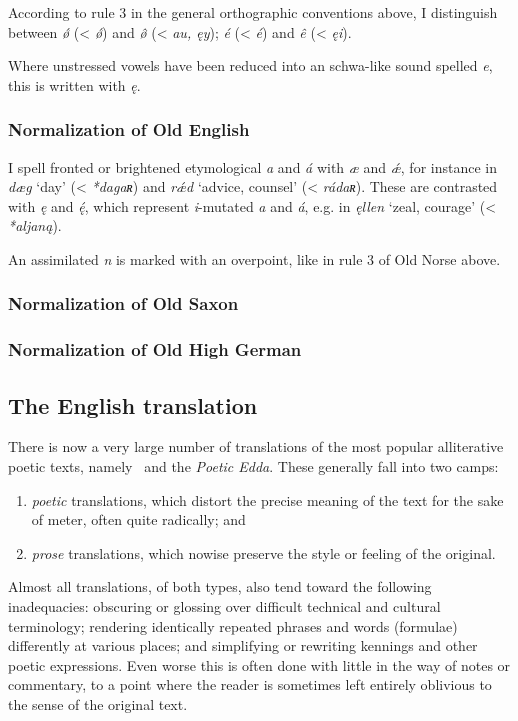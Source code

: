    According to rule 3 in the general orthographic conventions above, I distinguish between \emph{ǿ} (< \emph{ǿ}) and \emph{ø̂} (< \emph{au, ęy}); \emph{é} (< \emph{é}) and \emph{ê} (< \emph{ęi}).

    Where unstressed vowels have been reduced into an schwa-like sound spelled \emph{e}, this is written with \emph{ę}.

    \subsubsection{Normalization of Old English}
    I spell fronted or brightened etymological \emph{a} and \emph{á} with \emph{æ} and \emph{ǽ}, for instance in \emph{dæg} ‘day’ (< \emph{*dagaʀ}) and \emph{rǽd} ‘advice, counsel’ (< \emph{rádaʀ}).  These are contrasted with \emph{ę} and \emph{ę́}, which represent \emph{i}-mutated \emph{a} and \emph{á}, e.g. in \emph{ęllen} ‘zeal, courage’ (< \emph{*aljaną}).

    An assimilated \emph{n} is marked with an overpoint, like in rule 3 of Old Norse above.

    \subsubsection{Normalization of Old Saxon}

    \subsubsection{Normalization of Old High German}

  \subsection{The English translation}

    There is now a very large number of translations of the most popular alliterative poetic texts, namely \Beowulf\ and the \emph{Poetic Edda}.  These generally fall into two camps:
    \begin{enumerate}
      \item \emph{poetic} translations, which distort the precise meaning of the text for the sake of meter, often quite radically; and
      \item \emph{prose} translations, which nowise preserve the style or feeling of the original.
    \end{enumerate}

    Almost all translations, of both types, also tend toward the following inadequacies: obscuring or glossing over difficult technical and cultural terminology; rendering identically repeated phrases and words (formulae) differently at various places; and simplifying or rewriting kennings and other poetic expressions.  Even worse this is often done with little in the way of notes or commentary, to a point where the reader is sometimes left entirely oblivious to the sense of the original text.

